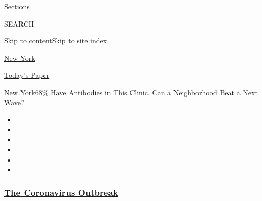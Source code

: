 Sections

SEARCH

\protect\hyperlink{site-content}{Skip to
content}\protect\hyperlink{site-index}{Skip to site index}

\href{https://www.nytimes3xbfgragh.onion/section/nyregion}{New York}

\href{https://myaccount.nytimes3xbfgragh.onion/auth/login?response_type=cookie\&client_id=vi}{}

\href{https://www.nytimes3xbfgragh.onion/section/todayspaper}{Today's
Paper}

\href{/section/nyregion}{New York}\textbar{}68\% Have Antibodies in This
Clinic. Can a Neighborhood Beat a Next Wave?

\begin{itemize}
\item
\item
\item
\item
\item
\item
\end{itemize}

\hypertarget{the-coronavirus-outbreak}{%
\subsubsection{\texorpdfstring{\href{https://www.nytimes3xbfgragh.onion/news-event/coronavirus?name=styln-coronavirus-national\&region=TOP_BANNER\&variant=undefined\&block=storyline_menu_recirc\&action=click\&pgtype=Article\&impression_id=3583c990-e38b-11ea-97c1-25b780906619}{The
Coronavirus
Outbreak}}{The Coronavirus Outbreak}}\label{the-coronavirus-outbreak}}

